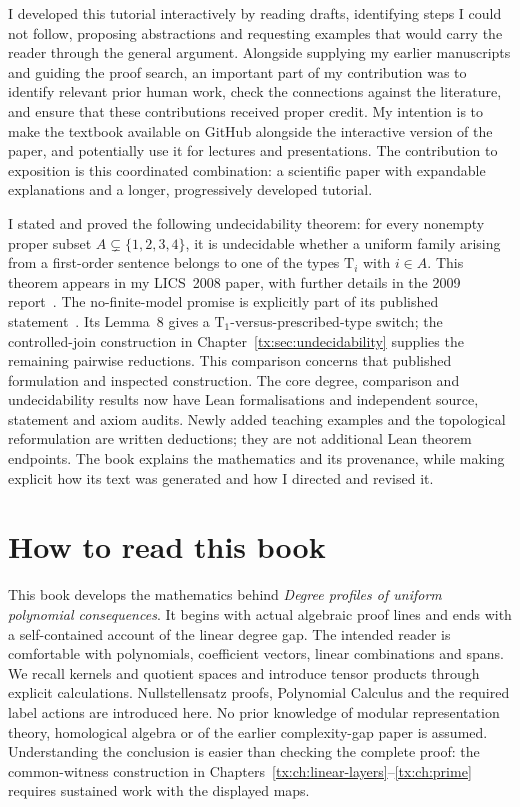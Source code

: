\documentclass[11pt,a4paper,oneside,openany]{book}
\theoremstyle{definition}\newtheorem{definition}[theorem]{Definition}
\theoremstyle{remark}\newtheorem{remark}[theorem]{Remark}
\numberwithin{equation}{chapter}
\begin{document}
I developed this tutorial interactively by reading drafts, identifying
steps I could not follow, proposing abstractions and requesting examples
that would carry the reader through the general argument. Alongside
supplying my earlier manuscripts and guiding the proof search, an
important part of my contribution was to identify relevant prior human
work, check the connections against the literature, and ensure that
these contributions received proper credit. My intention is to make
the textbook available on GitHub alongside the interactive
version of the paper, and potentially use it for lectures and
presentations. The contribution to exposition is this coordinated
combination: a scientific paper with expandable explanations and a
longer, progressively developed tutorial.

I stated and proved the following undecidability theorem: for every
nonempty proper subset $A\subsetneq\{1,2,3,4\}$, it is undecidable
whether a uniform family arising from a first-order sentence belongs
to one of the types $\mathrm T_i$ with $i\in A$.
This theorem appears in my LICS~2008 paper, with further details in
the 2009 report~\cite{Riis,RiisLong}.
The no-finite-model promise is explicitly part of its published
statement~\cite[Theorem~1]{Riis}. Its Lemma~8 gives a
$\mathrm T_1$-versus-prescribed-type switch; the controlled-join
construction in Chapter~\ref{tx:sec:undecidability} supplies the
remaining pairwise reductions. This comparison concerns that
published formulation and inspected construction.
The core degree, comparison and undecidability results now have Lean
formalisations and independent source, statement and axiom audits.
Newly added teaching examples and the topological reformulation are
written deductions; they are not additional Lean theorem endpoints. The book explains
the mathematics and its provenance, while making explicit how its text
was generated and how I directed and revised it.

\par\endgroup

\chapter*{How to read this book}
This book develops the mathematics behind \emph{Degree profiles of
uniform polynomial consequences}. It begins with actual algebraic proof
lines and ends with a self-contained account of the linear degree gap.
The intended reader is comfortable with polynomials, coefficient
vectors, linear combinations and spans. We recall kernels and quotient
spaces and introduce tensor products through explicit calculations.
Nullstellensatz proofs, Polynomial Calculus and the required label
actions are introduced here. No prior knowledge of modular
representation theory, homological algebra or of the earlier
complexity-gap paper is assumed. Understanding the conclusion is easier
than checking the complete proof: the common-witness construction in
Chapters~\ref{tx:ch:linear-layers}--\ref{tx:ch:prime} requires sustained
work with the displayed maps.
\end{document}
